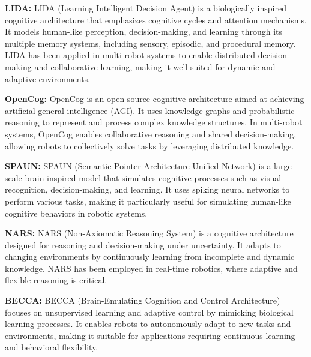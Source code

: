             \textbf{LIDA:} LIDA (Learning Intelligent Decision Agent) is a biologically inspired cognitive architecture that emphasizes cognitive cycles and attention mechanisms. It models human-like perception, decision-making, and learning through its multiple memory systems, including sensory, episodic, and procedural memory. LIDA has been applied in multi-robot systems to enable distributed decision-making and collaborative learning, making it well-suited for dynamic and adaptive environments. 

            \textbf{OpenCog:} OpenCog is an open-source cognitive architecture aimed at achieving artificial general intelligence (AGI). It uses knowledge graphs and probabilistic reasoning to represent and process complex knowledge structures. In multi-robot systems, OpenCog enables collaborative reasoning and shared decision-making, allowing robots to collectively solve tasks by leveraging distributed knowledge. 

            \textbf{SPAUN:} SPAUN (Semantic Pointer Architecture Unified Network) is a large-scale brain-inspired model that simulates cognitive processes such as visual recognition, decision-making, and learning. It uses spiking neural networks to perform various tasks, making it particularly useful for simulating human-like cognitive behaviors in robotic systems. 

            \textbf{NARS:} NARS (Non-Axiomatic Reasoning System) is a cognitive architecture designed for reasoning and decision-making under uncertainty. It adapts to changing environments by continuously learning from incomplete and dynamic knowledge. NARS has been employed in real-time robotics, where adaptive and flexible reasoning is critical. 

            \textbf{BECCA:} BECCA (Brain-Emulating Cognition and Control Architecture) focuses on unsupervised learning and adaptive control by mimicking biological learning processes. It enables robots to autonomously adapt to new tasks and environments, making it suitable for applications requiring continuous learning and behavioral flexibility. 

